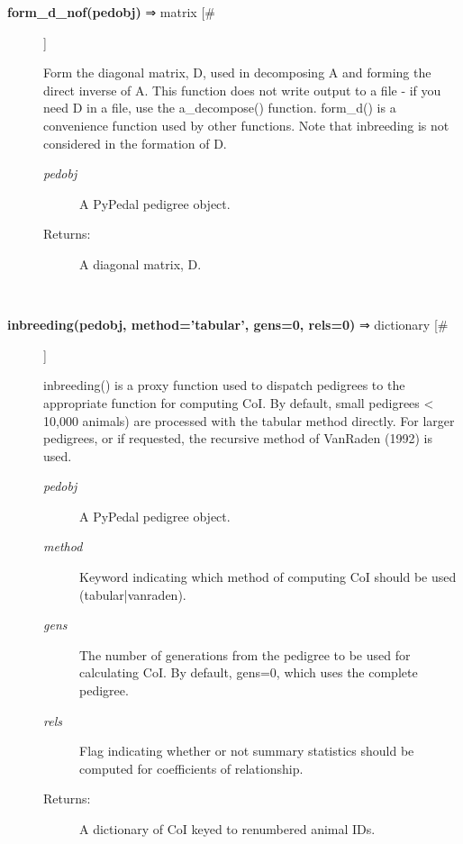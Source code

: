 \begin{description}
\item[\textbf{form\_d\_nof(pedobj)} ⇒ matrix [\#]
]
\par Form the diagonal matrix, D, used in decomposing A and forming the direct
inverse of A.  This function does not write output to a file - if you need D in
a file, use the a\_decompose()  function.  form\_d() is a convenience function
used by other functions.  Note that inbreeding is not considered in the
formation of D.
\begin{description}
\item[\textit{pedobj}
]
A PyPedal pedigree object.
\item[Returns:
]
A diagonal matrix, D.
\end{description}\\

\item[\textbf{inbreeding(pedobj, method='tabular', gens=0, rels=0)} ⇒ dictionary [\#]
]
\par inbreeding() is a proxy function used to dispatch pedigrees to the appropriate
function for computing CoI.  By default, small pedigrees < 10,000 animals) are
processed with the tabular method directly.  For larger pedigrees, or if requested,
the recursive method of VanRaden (1992) is used.
\begin{description}
\item[\textit{pedobj}
]
A PyPedal pedigree object.
\item[\textit{method}
]
Keyword indicating which method of computing CoI should be used (tabular|vanraden).
\item[\textit{gens}
]
The number of generations from the pedigree to be used for calculating CoI.  By default, gens=0, which uses the complete pedigree.
\item[\textit{rels}
]
Flag indicating whether or not summary statistics should be computed for coefficients of relationship.
\item[Returns:
]
A dictionary of CoI keyed to renumbered animal IDs.
\end{description}\\


\end{description}

